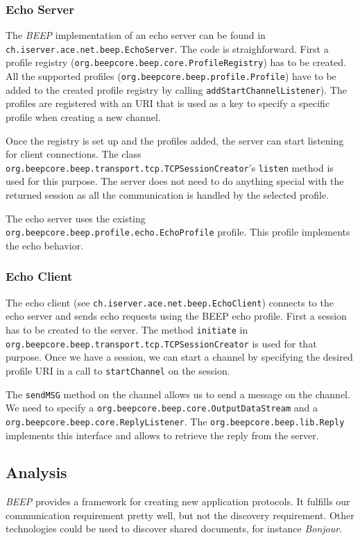 \subsubsection{Echo Server}
The \emph{BEEP} implementation of an echo server can be found in \texttt{ch.iserver.ace.net.beep.EchoServer}. The code is straighforward. First a profile registry (\texttt{org.beepcore.beep.core.ProfileRegistry}) has to be created. All the supported profiles (\texttt{org.beepcore.beep.profile.Profile}) have to be added to the created profile registry by calling \texttt{addStartChannelListener}). The profiles are registered with an URI that is used as a key to specify a specific profile when creating a new channel.

Once the registry is set up and the profiles added, the server can start listening for client connections. The class \texttt{org.beepcore.beep.transport.tcp.TCPSessionCreator}'s \texttt{listen} method is used for this purpose. The server does not need to do anything special with the returned session as all the communication is handled by the selected profile.

The echo server uses the existing \texttt{org.beepcore.beep.profile.echo.EchoProfile} profile. This profile implements the echo behavior.

\subsubsection{Echo Client}
The echo client (see \texttt{ch.iserver.ace.net.beep.EchoClient}) connects to the echo server and sends echo requests using the BEEP echo profile. First a session has to be created to the server. The method \texttt{initiate} in \texttt{org.beepcore.beep.transport.tcp.TCPSessionCreator} is used for that purpose. Once we have a session, we can start a channel by specifying the desired profile URI in a call to \texttt{startChannel} on the session.

The \texttt{sendMSG} method on the channel allows us to send a message on the channel. We need to specify a \texttt{org.beepcore.beep.core.OutputDataStream} and a \texttt{org.beepcore.beep.core.ReplyListener}. The \texttt{org.beepcore.beep.lib.Reply} implements this interface and allows to retrieve the reply from the server.



\subsection{Analysis}
\emph{BEEP} provides a framework for creating new application protocols. It fulfills our communication requirement pretty well, but not the discovery requirement. Other technologies could be used to discover shared documents, for instance \emph{Bonjour}.

